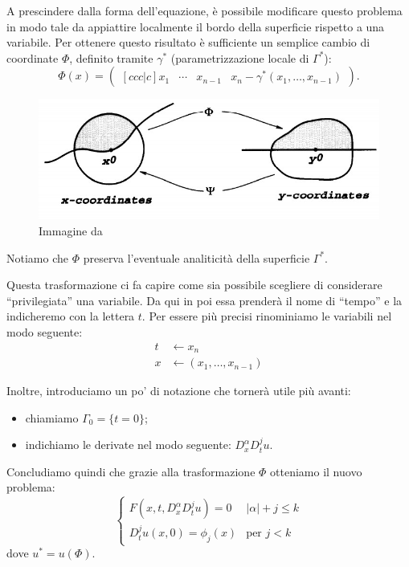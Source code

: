 A prescindere dalla forma dell'equazione, è possibile modificare questo problema in modo tale da appiattire localmente il bordo della superficie rispetto a una variabile. Per ottenere questo risultato è sufficiente un semplice cambio di coordinate $\Phi$, definito tramite $\gamma^*$ (parametrizzazione locale di $\Gamma^*$):
$$\Phi (x) = 
\left( \begin{matrix}[ccc|c]
x_1 & \cdots & x_{n-1} & x_n-\gamma^* (x_1,\ldots , x_{n-1})
\end{matrix}\right).$$
\begin{figure}[H]
\centering
\includegraphics[scale=.5]{flatb}
\caption{Immagine da \cite[cap.8]{Evans}}
\end{figure}
\begin{remark}
Notiamo che $\Phi$ preserva l'eventuale analiticità della superficie $\Gamma^*$.
\end{remark}

Questa trasformazione ci fa capire come sia possibile scegliere di considerare ``privilegiata'' una variabile. Da qui in poi essa prenderà il nome di ``tempo'' e la indicheremo con la lettera $t$. Per essere più precisi rinominiamo le variabili nel modo seguente:
\begin{align*}
t & \leftarrow x_n \\
x & \leftarrow (x_1,\ldots , x_{n-1})
\end{align*}

\newpage
Inoltre, introduciamo un po' di notazione che tornerà utile più avanti:
\begin{itemize}
\item chiamiamo $\Gamma_0 = \{t=0\}$;
\item indichiamo le derivate nel modo seguente: $D^\alpha_x D^j_t u$.
\end{itemize}
Concludiamo quindi che grazie alla trasformazione $\Phi$ otteniamo il nuovo problema:
\begin{equation}\label{gamma0prob}
\begin{cases}
F(x,t, D^\alpha_x D^j_t u)=0 & |\alpha | +j \leq k\\
D^j_t u (x,0)= \phi_j(x) & \text{per }j<k 
\end{cases}
\end{equation}
dove $u^*=u(\Phi)$.

